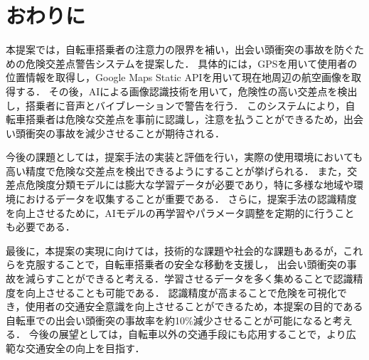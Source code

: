 \documentclass[uplatex,dvipdfmx]{jsarticle}
\begin{document}
\section{おわりに}
\indent
本提案では，自転車搭乗者の注意力の限界を補い，出会い頭衝突の事故を防ぐための危険交差点警告システムを提案した．
具体的には，GPSを用いて使用者の位置情報を取得し，Google Maps Static APIを用いて現在地周辺の航空画像を取得する．
その後，AIによる画像認識技術を用いて，危険性の高い交差点を検出し，搭乗者に音声とバイブレーションで警告を行う．
このシステムにより，自転車搭乗者は危険な交差点を事前に認識し，注意を払うことができるため，出会い頭衝突の事故を減少させることが期待される．
\par
今後の課題としては，提案手法の実装と評価を行い，実際の使用環境においても高い精度で危険な交差点を検出できるようにすることが挙げられる．
また，交差点危険度分類モデルには膨大な学習データが必要であり，特に多様な地域や環境におけるデータを収集することが重要である．
さらに，提案手法の認識精度を向上させるために，AIモデルの再学習やパラメータ調整を定期的に行うことも必要である．
\par
最後に，本提案の実現に向けては，技術的な課題や社会的な課題もあるが，これらを克服することで，自転車搭乗者の安全な移動を支援し，
出会い頭衝突の事故を減らすことができると考える．学習させるデータを多く集めることで認識精度を向上させることも可能である．
認識精度が高まることで危険を可視化でき，使用者の交通安全意識を向上させることができるため，本提案の目的である自転車での出会い頭衝突の事故率を約10\%減少させることが可能になると考える．
今後の展望としては，自転車以外の交通手段にも応用することで，より広範な交通安全の向上を目指す．
\par
\end{document}
